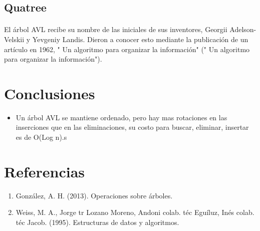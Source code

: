 \documentclass{article}
\begin{document}
    \subsection{Quatree}
        \paragraph{}
        El árbol AVL recibe su nombre de las iniciales  de sus inventores, Georgii Adelson-Velskii y Yevgeniy Landis. Dieron a conocer esto mediante la publicación de un artículo en 1962, " Un algoritmo para organizar la información" (" Un algoritmo para organizar la información").



    \section{Conclusiones}
        \begin{itemize}
                 \item Un árbol AVL se mantiene ordenado, pero hay mas rotaciones en las inserciones que en las eliminaciones, su costo para buscar, eliminar, insertar  es de O(Log n).s
        \end{itemize}
    \section{Referencias}
  \begin{enumerate}
    \item González, A. H. (2013). Operaciones sobre árboles.
    \item	Weiss, M. A., Jorge tr Lozano Moreno, Andoni colab. téc Eguíluz,   Inés colab. téc Jacob. (1995). Estructuras de datos y algoritmos.
  \end{enumerate}
\end{document}
